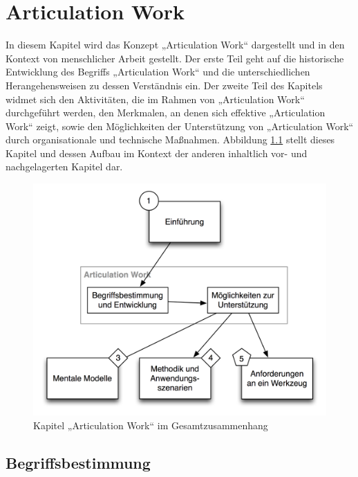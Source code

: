 
\chapter{Articulation Work} %
\label{cha:articulation_work}

In diesem Kapitel wird das Konzept „Articulation Work“ dargestellt und in den Kontext von menschlicher Arbeit gestellt. Der erste Teil geht auf die historische Entwicklung des Begriffs „Articulation Work“ und die unterschiedlichen Herangehensweisen zu dessen Verständnis ein. Der zweite Teil des Kapitels widmet sich den Aktivitäten, die im Rahmen von „Articulation Work“ durchgeführt werden, den Merkmalen, an denen sich effektive „Articulation Work“ zeigt, sowie den Möglichkeiten der Unterstützung von „Articulation Work“ durch organisationale und technische Maßnahmen. Abbildung \ref{fig:img_Kontextgrafiken_k2} stellt dieses Kapitel und dessen Aufbau im Kontext der anderen inhaltlich vor- und nachgelagerten Kapitel dar.


\begin{figure}[htbp]
	\centering
		\includegraphics[scale=0.6]{img/Kontextgrafiken/k2.png}
	\caption{Kapitel „Articulation Work“ im Gesamtzusammenhang}
	\label{fig:img_Kontextgrafiken_k2}
\end{figure}

\section{Begriffsbestimmung} %
\label{sec:aw_begriffsbestimmung}

